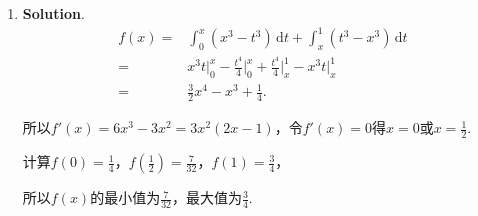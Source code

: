 \documentclass[../Main.tex]{subfiles}
\begin{document}
\begin{enumerate}
          令$u=-x^{2}+2x$，则$\mathrm{d}u=(-2x+2)\,\mathrm{d}x=-2(x-1)\,\mathrm{d}x$，$(x
              -1)^{2}=-u+1$，所以
          \[
              \begin{aligned}
                  I = -\frac{1}{3}\int_{0}^{1}(x-1)^{3} \mathrm{e}^{-x^2+2x}\,\mathrm{d}x = & -\frac{1}{3}\int_{0}^{1}(x-1)^{2}\mathrm{e}^{u}\cdot\left(-\frac{1}{2}\right)\,\mathrm{d}u                                      \\
                  =                                                                         & \frac{1}{6}\int_{0}^{1}(-u+1)\mathrm{e}^{u}\,\mathrm{d}u = \frac{1}{6}\int_{0}^{1}(\mathrm{e}^{u}-u\mathrm{e}^{u})\,\mathrm{d}u \\
                  =                                                                         & \frac{1}{6}\left[\mathrm{e}^{u}\Big|_{0}^{1}-(u-1)\mathrm{e}^{u}\Big|_{0}^{1}\right]                                            \\
                  =                                                                         & \frac{1}{6}(\mathrm{e}-2).
              \end{aligned}
          \]

    \item \textbf{Solution}.
          \[
              \begin{aligned}
                  f(x)= & \int_{0}^{x}(x^{3}-t^{3})\,\mathrm{d}t+\int_{x}^{1}(t^{3}-x^{3})\,\mathrm{d}t                     \\
                  =     & x^{3}t\bigg|_{0}^{x}-\frac{t^4}{4}\bigg|_{0}^{x}+\frac{t^4}{4}\bigg|_{x}^{1}-x^{3}t\bigg|_{x}^{1} \\
                  =     & \frac{3}{2}x^{4}-x^{3}+\frac{1}{4}.
              \end{aligned}
          \]

          所以$f'(x)=6x^{3}-3x^{2}=3x^{2}(2x-1)$，令$f'(x)=0$得$x=0$或$x=\frac{1}{2}$.

          计算$f(0)=\frac{1}{4}$，$f\left(\frac{1}{2}\right)=\frac{7}{32}$，$f(1)=\frac{3}{4}$，

          所以$f(x)$的最小值为$\frac{7}{32}$，最大值为$\frac{3}{4}$.
\end{enumerate}
\end{document}
